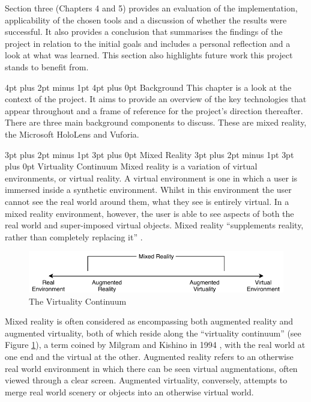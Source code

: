 \documentclass[12pt,a4paper,oneside]{article}
\makeatletter
\renewcommand\subsubsection{\@startsection {subsubsection}{1}{0mm} %
	                           {3pt plus 2pt minus 1pt} %
	                           {3pt plus 0pt} %
	                           {\normalfont\bfseries}}
\renewcommand\subsection{\@startsection {subsection}{1}{0mm} %
                               {3pt plus 2pt minus 1pt} %
                               {3pt plus 0pt} %
                               {\large\bfseries}}
\renewcommand\section{\@startsection {section}{1}{0mm} %
                               {4pt plus 2pt minus 1pt} %
                               {4pt plus 0pt} %
                               {\Large\bfseries}}
\makeatother
\begin{document}
Section three (Chapters 4 and 5) provides an evaluation of the implementation, applicability of the chosen tools and a discussion of whether the results were successful. It also provides a conclusion that summarises the findings of the project in relation to the initial goals and includes a personal reflection and a look at what was learned. This section also highlights future work this project stands to benefit from.

\newpage
\section{Background}
This chapter is a look at the context of the project. It aims to provide an overview of the key technologies that appear throughout and a frame of reference for the project's direction thereafter. There are three main background components to discuss. These are mixed reality, the Microsoft HoloLens and Vuforia.

\subsection{Mixed Reality}
\subsubsection{Virtuality Continuum}
Mixed reality is a variation of virtual environments, or virtual reality. A virtual environment is one in which a user is immersed inside a synthetic environment. Whilst in this environment the user cannot see the real world around them, what they see is entirely virtual. In a mixed reality environment, however, the user is able to see aspects of both the real world and super-imposed virtual objects. Mixed reality ``supplements reality, rather than completely replacing it'' \cite{azuma97}.

\begin{figure}[!h]
	\centering
	\includegraphics[width=\textwidth]{images/virtualitycontinuum}
	\caption{The Virtuality Continuum}
	\label{fig_mr}
\end{figure}

Mixed reality is often considered as encompassing both augmented reality and augmented virtuality, both of which reside along the ``virtuality continuum'' (see Figure \ref{fig_mr}), a term coined by Milgram and Kishino in 1994  \cite{milgram94}, with the real world at one end and the virtual at the other. Augmented reality refers to an otherwise real world environment in which there can be seen virtual augmentations, often viewed through a clear screen. Augmented virtuality, conversely, attempts to merge real world scenery or objects into an otherwise virtual world.
\end{document}
